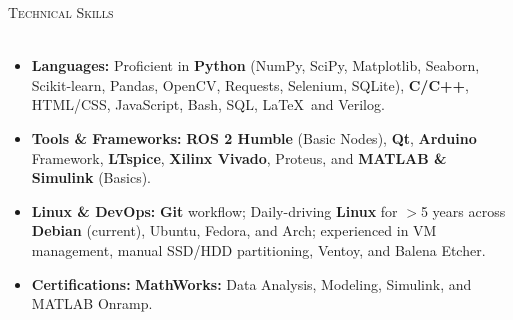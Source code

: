 \documentclass[a4paper]{article}
\newcommand{\lineunder} {
    \vspace*{-8pt} \\
    \hspace*{-18pt} \hrulefill \\
}
\newcommand{\header} [1] {
    {\hspace*{-18pt}\vspace*{6pt} \textsc{#1}}
    \vspace*{-6pt} \lineunder
}
\begin{document}
\header{Technical Skills}
\begin{itemize} \itemsep 1pt
    \item \textbf{Languages:} Proficient in \textbf{Python} (NumPy, SciPy, Matplotlib, Seaborn, Scikit-learn, Pandas, OpenCV, Requests, Selenium, SQLite), \textbf{C/C++}, HTML/CSS, JavaScript, Bash, SQL, \LaTeX\, and Verilog.
    \item \textbf{Tools \& Frameworks:} \textbf{ROS 2 Humble} (Basic Nodes), \textbf{Qt}, \textbf{Arduino} Framework, \textbf{LTspice}, \textbf{Xilinx Vivado}, Proteus, and \textbf{MATLAB \& Simulink} (Basics).
    \item \textbf{Linux \& DevOps:} \textbf{Git} workflow; Daily-driving \textbf{Linux} for $>$5 years across \textbf{Debian} (current), Ubuntu, Fedora, and Arch; experienced in VM management, manual SSD/HDD partitioning, Ventoy, and Balena Etcher.
    \item \textbf{Certifications:} \textbf{MathWorks:} Data Analysis, Modeling, Simulink, and MATLAB Onramp.
\end{itemize}
\end{document}
